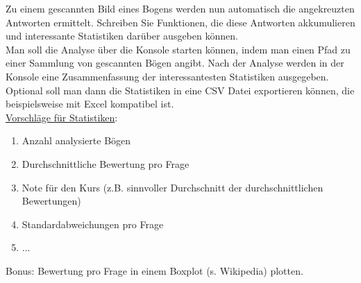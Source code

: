 Zu einem gescannten Bild eines Bogens werden nun automatisch die angekreuzten Antworten ermittelt. Schreiben Sie Funktionen, die diese Antworten akkumulieren und interessante Statistiken darüber ausgeben können.\\
Man soll die Analyse über die Konsole starten können, indem man einen Pfad zu einer Sammlung von gescannten Bögen angibt. Nach der Analyse werden in der Konsole eine Zusammenfassung der interessantesten Statistiken ausgegeben. Optional soll man dann die Statistiken in eine CSV Datei exportieren können, die beispielsweise mit Excel kompatibel ist.\\
\underline{Vorschläge für Statistiken}:
\begin{enumerate}
\item Anzahl analysierte Bögen
\item Durchschnittliche Bewertung pro Frage
\item Note für den Kurs (z.B. sinnvoller Durchschnitt der durchschnittlichen Bewertungen)
\item Standardabweichungen pro Frage
\item ...
\end{enumerate}
Bonus: Bewertung pro Frage in einem Boxplot (s. Wikipedia) plotten.